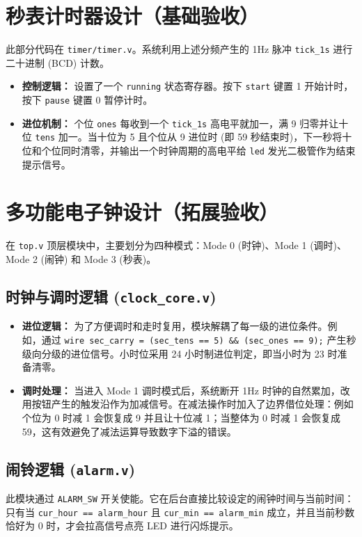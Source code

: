 \documentclass[12pt, a4paper]{ctexart}
\begin{document}
\section{秒表计时器设计（基础验收）}
此部分代码在 \texttt{timer/timer.v}。系统利用上述分频产生的 1Hz 脉冲 \texttt{tick\_1s} 进行二十进制 (BCD) 计数。
\begin{itemize}
    \item \textbf{控制逻辑：} 设置了一个 \texttt{running} 状态寄存器。按下 \texttt{start} 键置 1 开始计时，按下 \texttt{pause} 键置 0 暂停计时。
    \item \textbf{进位机制：} 个位 \texttt{ones} 每收到一个 \texttt{tick\_1s} 高电平就加一，满 9 归零并让十位 \texttt{tens} 加一。当十位为 5 且个位从 9 进位时 (即 59 秒结束时)，下一秒将十位和个位同时清零，并输出一个时钟周期的高电平给 \texttt{led} 发光二极管作为结束提示信号。
\end{itemize}

\section{多功能电子钟设计（拓展验收）}
在 \texttt{top.v} 顶层模块中，主要划分为四种模式：Mode 0 (时钟)、Mode 1 (调时)、Mode 2 (闹钟) 和 Mode 3 (秒表)。

\subsection{时钟与调时逻辑 (\texttt{clock\_core.v})}
\begin{itemize}
    \item \textbf{进位逻辑：} 为了方便调时和走时复用，模块解耦了每一级的进位条件。例如，通过 \texttt{wire sec\_carry = (sec\_tens == 5) \&\& (sec\_ones == 9);} 产生秒级向分级的进位信号。小时位采用 24 小时制进位判定，即当小时为 23 时准备清零。
    \item \textbf{调时处理：} 当进入 Mode 1 调时模式后，系统断开 1Hz 时钟的自然累加，改用按钮产生的触发沿作为加减信号。在减法操作时加入了边界借位处理：例如个位为 0 时减 1 会恢复成 9 并且让十位减 1；当整体为 0 时减 1 会恢复成 59，这有效避免了减法运算导致数字下溢的错误。
\end{itemize}

\subsection{闹铃逻辑 (\texttt{alarm.v})}
此模块通过 \texttt{ALARM\_SW} 开关使能。它在后台直接比较设定的闹钟时间与当前时间：只有当 \texttt{cur\_hour == alarm\_hour} 且 \texttt{cur\_min == alarm\_min} 成立，并且当前秒数恰好为 0 时，才会拉高信号点亮 LED 进行闪烁提示。
\end{document}
